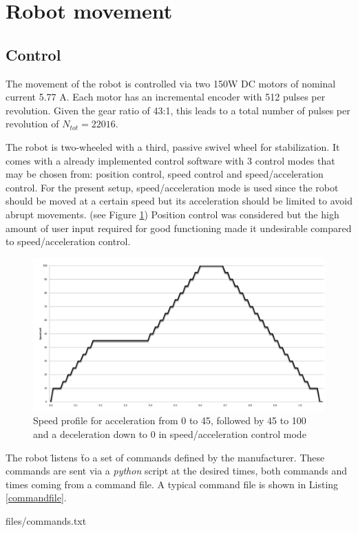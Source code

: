 \section{Robot movement}

\subsection{Control}
\label{sec:movement}

The movement of the robot is controlled via two 150W DC motors of nominal current 5.77 A. Each motor has an incremental encoder with 512 pulses per revolution. Given the gear ratio of 43:1, this leads to a total number of pulses per revolution of $N_{tot}=22016$.

The robot is two-wheeled with a third, passive swivel wheel for stabilization. It comes with a already implemented control software with 3 control modes that may be chosen from: position control, speed control and speed/acceleration control. 
For the present setup, speed/acceleration mode is used since the robot should be moved at a certain speed but its acceleration should be limited to avoid abrupt movements. (see Figure \ref{fig:acceleration})
Position control was considered but the high amount of user input required for good functioning made it undesirable compared to speed/acceleration control.

\begin{figure}[htb]
    \centering
    \includegraphics[width=0.5\linewidth]{files/Acceleration.png}
    \caption{Speed profile for acceleration from 0 to 45, followed by 45 to 100 and a deceleration down to 0 in speed/acceleration control mode}
    \label{fig:acceleration}
\end{figure}

The robot \" listens \" to a set of commands defined by the manufacturer. These commands are sent via a \textit{python} script at the desired times, both commands and times coming from a command file. A typical command file is shown in Listing \ref{commandfile}.

\begin{center}
\begin{minipage}{0.9\linewidth}
    \begin{center}
\begin{lstinputlisting}[caption=\texttt{commands.txt}., label=commandfile, frame=none,numbers=none,xleftmargin=.45\textwidth]{files/commands.txt}
\end{lstinputlisting}
\end{center}
\end{minipage}
\end{center}

